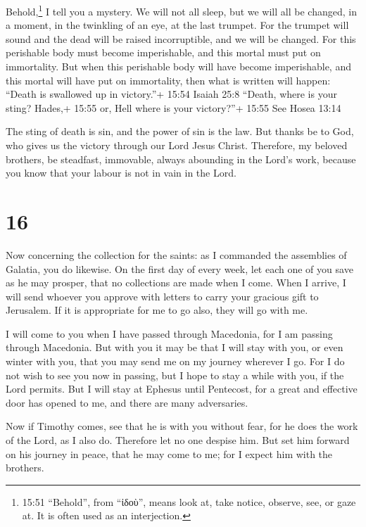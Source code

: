  Behold,\footnote{15:51 ``Behold'', from ``ἰδοὺ'', means
  look at, take notice, observe, see, or gaze at. It is often used as an
  interjection.} I tell you a mystery. We will not all sleep, but we
will all be changed,  in a moment, in the twinkling of an
eye, at the last trumpet. For the trumpet will sound and the dead will
be raised incorruptible, and we will be changed.  For this
perishable body must become imperishable, and this mortal must put on
immortality.  But when this perishable body will have
become imperishable, and this mortal will have put on immortality, then
what is written will happen: ``Death is swallowed up in victory.''+
15:54 Isaiah 25:8  ``Death, where is your sting? Hades,+
15:55 or, Hell where is your victory?''+ 15:55 See Hosea 13:14

 The sting of death is sin, and the power of sin is the
law.  But thanks be to God, who gives us the victory
through our Lord Jesus Christ.  Therefore, my beloved
brothers, be steadfast, immovable, always abounding in the Lord's work,
because you know that your labour is not in vain in the Lord.

\hypertarget{section-15}{%
\section{16}\label{section-15}}

 Now concerning the collection for the saints: as I
commanded the assemblies of Galatia, you do likewise.  On
the first day of every week, let each one of you save as he may prosper,
that no collections are made when I come.  When I arrive, I
will send whoever you approve with letters to carry your gracious gift
to Jerusalem.  If it is appropriate for me to go also, they
will go with me.

 I will come to you when I have passed through Macedonia,
for I am passing through Macedonia.  But with you it may be
that I will stay with you, or even winter with you, that you may send me
on my journey wherever I go.  For I do not wish to see you
now in passing, but I hope to stay a while with you, if the Lord
permits.  But I will stay at Ephesus until Pentecost,
 for a great and effective door has opened to me, and there
are many adversaries.

 Now if Timothy comes, see that he is with you without
fear, for he does the work of the Lord, as I also do. 
Therefore let no one despise him. But set him forward on his journey in
peace, that he may come to me; for I expect him with the brothers.

